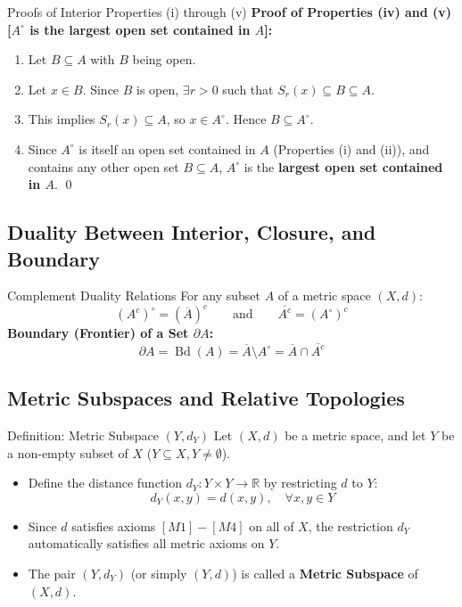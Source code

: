 \documentclass[11pt,a4paper]{article}
\begin{document}
\begin{exbox}{Proofs of Interior Properties (i) through (v)}
\textbf{Proof of Properties (iv) and (v) [$A^\circ$ is the largest open set contained in $A$]:}
\begin{enumerate}
    \item Let $B \subseteq A$ with $B$ being open.
    \item Let $x \in B$. Since $B$ is open, $\exists r > 0$ such that $S_r(x) \subseteq B \subseteq A$.
    \item This implies $S_r(x) \subseteq A$, so $x \in A^\circ$. Hence $B \subseteq A^\circ$.
    \item Since $A^\circ$ is itself an open set contained in $A$ (Properties (i) and (ii)), and contains any other open set $B \subseteq A$, $A^\circ$ is the \textbf{largest open set contained in $A$}. \qed
\end{enumerate}
\end{exbox}

\newpage

\subsection{Duality Between Interior, Closure, and Boundary}

\begin{formulabox}{Complement Duality Relations}
For any subset $A$ of a metric space $(X, d)$:
\begin{equation}
    (A^c)^\circ = (\overline{A})^c \qquad \text{and} \qquad \overline{A^c} = (A^\circ)^c
\end{equation}
\textbf{Boundary (Frontier) of a Set $\partial A$:}
\begin{equation}
    \partial A = \operatorname{Bd}(A) = \overline{A} \setminus A^\circ = \overline{A} \cap \overline{A^c}
\end{equation}
\end{formulabox}

\subsection{Metric Subspaces and Relative Topologies}

\begin{defbox}{Definition: Metric Subspace $(Y, d_Y)$}
Let $(X, d)$ be a metric space, and let $Y$ be a non-empty subset of $X$ ($Y \subseteq X, Y \neq \emptyset$).
\begin{itemize}
    \item Define the distance function $d_Y: Y \times Y \to \mathbb{R}$ by restricting $d$ to $Y$:
    \begin{equation}
        d_Y(x, y) = d(x, y), \quad \forall x, y \in Y
    \end{equation}
    \item Since $d$ satisfies axioms $[M1]-[M4]$ on all of $X$, the restriction $d_Y$ automatically satisfies all metric axioms on $Y$.
    \item The pair $(Y, d_Y)$ (or simply $(Y, d)$) is called a \textbf{Metric Subspace} of $(X, d)$.
\end{itemize}
\end{defbox}
\end{document}
